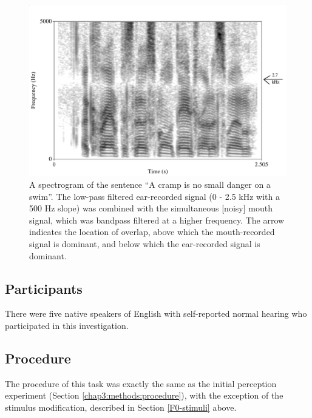 \begin{figure}[h]
\DIFaddendFL \centering
  \DIFdelbeginFL %
\DIFdelendFL \DIFaddbeginFL \includegraphics[width=\textwidth]{figure/combined-signal_labeled.png}
  \DIFaddendFL \caption{A spectrogram of the sentence ``A cramp is no small danger on a swim''.  The low-pass filtered ear-recorded signal (0 - 2.5 kHz with a 500 Hz slope) was combined with the simultaneous [noisy] mouth signal, which was bandpass filtered at a higher frequency.  The arrow indicates the location of overlap, above which the mouth-recorded signal is dominant, and below which the ear-recorded signal is dominant.}
  \label{fig:combined-signal}
\DIFdelbeginFL %
\DIFdelendFL \DIFaddbeginFL \end{figure}
\DIFaddend %

\subsection{Participants}
There were five native speakers of English with self-reported normal hearing who participated in this investigation.  

\subsection{Procedure}
The procedure of this task was exactly the same as the initial perception experiment (Section \ref{chap3:methods:procedure}), with the exception of the stimulus modification, described in Section \ref{F0-stimuli} above.


